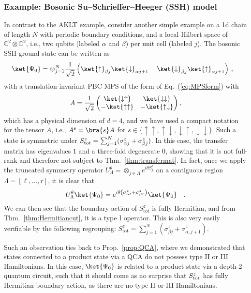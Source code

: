 \documentclass[prx,letterpaper,aps,superscriptaddress,floatfix,twocolumn,nofootinbib]{revtex4-2}
\theoremstyle{definition}
\newcommand{\tot}{\text{tot}}
\begin{document}
%
\subsubsection{Example: Bosonic Su–Schrieffer–Heeger (SSH) model}
\label{sec:exZ2SPT}
%
In contrast to the AKLT example, consider another simple example on a 1d chain of length $N$ with periodic boundary conditions, and a local Hilbert space of $\mathbb{C}^2\otimes \mathbb{C}^2$, i.e., two qubits (labeled $\alpha$ and $\beta$) per unit cell (labeled $j$).
%
The bosonic SSH ground state can be written as
\begin{align}
    \ket{\Psi_0}&=\otimes_{j=1}^N\frac{1}{\sqrt{2}}\left(\ket{\uparrow}_{\beta j}\ket{\downarrow}_{\alpha j+1}-\ket{\downarrow}_{\beta j}\ket{\uparrow}_{\alpha j+1}\right)\,,
\end{align}
with a translation-invariant PBC MPS of the form of Eq.~(\ref{eq:MPSform}) with
\begin{equation}
    A=\frac{1}{\sqrt{2}}
    \begin{pmatrix}
        \ket{\downarrow\uparrow} &\ket{\downarrow\downarrow} \\
        -\ket{\uparrow\uparrow}  & -\ket{\uparrow\downarrow}
    \end{pmatrix},
\end{equation}
which has a physical dimension of $d = 4$, and we have used a compact notation for the tensor $A$, i.e., $A^s = \bra{s}A$ for $s \in \{\uparrow\uparrow, \uparrow\downarrow, \downarrow\uparrow, \downarrow\downarrow\}$.
%
Such a state is symmetric under $S^z_{\rm tot}=\sum_{j=1}^N (\sigma^z_{\alpha j}+\sigma^z_{\beta j})$.
%
In this case, the transfer matrix has eigenvalues $1$ and a three-fold degenerate $0$, showing that it is not full-rank and therefore not subject to Thm.~\ref{thm:transfermat}.
%
In fact, once we apply the truncated symmetry operator $U_\Lambda^\theta=\otimes_{j\in\Lambda}e^{i\theta S^z_{j}}$ on a contiguous region $\Lambda = [\ell, \dots, r]$, it is clear that 
\begin{align}
    U_\Lambda^\theta\ket{\Psi_0}=e^{i\theta\left( \sigma^z_{\alpha\ell}+\sigma^z_{\beta r}\right)}\ket{\Psi_0}\quad.
\end{align}
%
We can then see that the boundary action of $S^z_{\tot}$ is fully Hermitian, and from Thm.~\ref{thm:Hermitiancut}, it is a type I operator.
%
This is also very easily verifiable by the following regrouping: $S^z_{\text{tot}} = \sum_{j=1}^N (\sigma^z_{\beta j} + \sigma^z_{\alpha,j+1})$.
%

%
Such an observation ties back to Prop.~\ref{prop:QCA}, where we demonstrated that states connected to a product state via a QCA do not possess type II or III Hamiltonians.
%
In this case, $\ket{\Psi_0}$ is related to a product state via a depth-2 quantum circuit, such that it should come as no surprise that $S_{\rm tot}^z$ has fully Hermitian boundary action, as there are no type II or III Hamiltonians.
%
\end{document}
